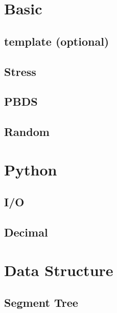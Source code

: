 \documentclass[a4paper,10pt,twocolumn,oneside]{article}
\begin{document}
\section{Basic}

\subsection{template (optional)}


\subsection{Stress}


\subsection{PBDS}


\subsection{Random}


\section{Python}
\subsection{I/O}


\subsection{Decimal}




\section{Data Structure}

\subsection{Segment Tree}


%
\end{document}
